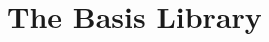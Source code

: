 \documentclass{jbook}
\newif\ifjp
\newcommand{\txt}[2]{#2}
\begin{document}
\section{\txt{ファンクタ定義}{}}
\ifjp%
\else%
\fi%

\subsection{\txt{ファンクタ定義宣言}{}}
\ifjp%
\else%
\fi%

\subsection{\txt{ファンクタ定義インターフェイス}{}}
\ifjp%
\else%
\fi%

\subsection{\txt{ファンクタ定義宣言とインタフェイスの例}{}}
\ifjp%
\else%
\fi%


% 
\chapter{\txt{標準ライブラリ}{The Basis Library}}
\end{document}
